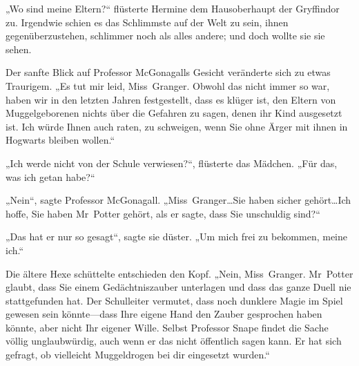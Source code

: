 „Wo sind meine Eltern?“ flüsterte Hermine dem Hausoberhaupt der Gryffindor zu. Irgendwie schien es das Schlimmste auf der Welt zu sein, ihnen gegenüberzustehen, schlimmer noch als alles andere; und doch wollte sie sie sehen.

Der sanfte Blick auf Professor McGonagalls Gesicht veränderte sich zu etwas Traurigem. „Es tut mir leid, Miss~Granger. Obwohl das nicht immer so war, haben wir in den letzten Jahren festgestellt, dass es klüger ist, den Eltern von Muggelgeborenen nichts über die Gefahren zu sagen, denen ihr Kind ausgesetzt ist. Ich würde Ihnen auch raten, zu schweigen, wenn Sie ohne Ärger mit ihnen in Hogwarts bleiben wollen.“

„Ich werde nicht von der Schule verwiesen?“, flüsterte das Mädchen. „Für das, was ich getan habe?“

„Nein“, sagte Professor McGonagall. „Miss~Granger…Sie haben sicher gehört…Ich hoffe, Sie haben Mr~Potter gehört, als er sagte, dass Sie unschuldig sind?“

„Das hat er nur so gesagt“, sagte sie düster. „Um mich frei zu bekommen, meine ich.“

Die ältere Hexe schüttelte entschieden den Kopf. „Nein, Miss~Granger. Mr~Potter glaubt, dass Sie einem Gedächtniszauber unterlagen und dass das ganze Duell nie stattgefunden hat. Der Schulleiter vermutet, dass noch dunklere Magie im Spiel gewesen sein könnte—dass Ihre eigene Hand den Zauber gesprochen haben könnte, aber nicht Ihr eigener Wille. Selbst Professor Snape findet die Sache völlig unglaubwürdig, auch wenn er das nicht öffentlich sagen kann. Er hat sich gefragt, ob vielleicht Muggeldrogen bei dir eingesetzt wurden.“

